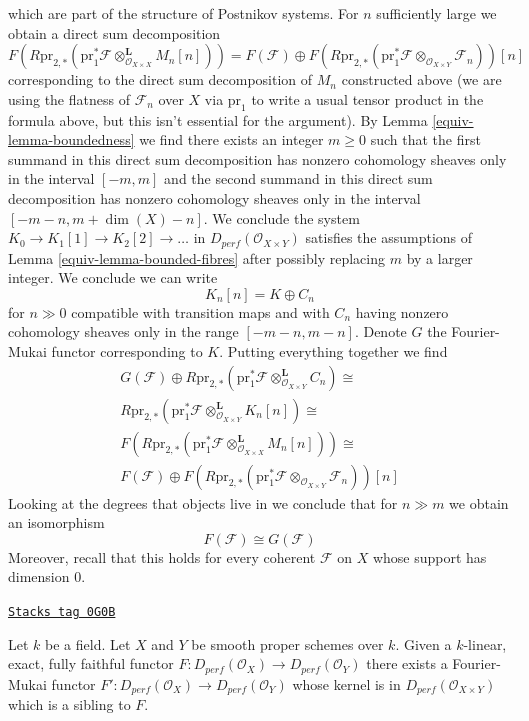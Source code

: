 which are part of the structure of Postnikov systems.
For $n$ sufficiently large we obtain a direct sum decomposition
$$
F(R\text{pr}_{2, *}(\text{pr}_1^*\mathcal{F}
\otimes^\mathbf{L}_{\mathcal{O}_{X \times X}} M_n[n]))
=
F(\mathcal{F}) \oplus
F(R\text{pr}_{2, *}(
\text{pr}_1^*\mathcal{F} \otimes_{\mathcal{O}_{X \times Y}} \mathcal{F}_n
))[n]
$$
corresponding to the direct sum decomposition of $M_n$ constructed above
(we are using the flatness of $\mathcal{F}_n$ over $X$ via $\text{pr}_1$
to write a usual tensor product in the formula above, but this isn't
essential for the argument).
By Lemma \ref{equiv-lemma-boundedness} we find there exists an integer $m \geq 0$
such that the first summand in this direct sum decomposition has nonzero
cohomology sheaves only in the interval $[-m, m]$ and the
second summand in this direct sum decomposition has nonzero cohomology
sheaves only in the interval $[-m - n, m + \dim(X) - n]$.
We conclude the system $K_0 \to K_1[1] \to K_2[2] \to \ldots$
in $D_{perf}(\mathcal{O}_{X \times Y})$ satisfies the assumptions of
Lemma \ref{equiv-lemma-bounded-fibres} after possibly replacing $m$ by
a larger integer. We conclude we can write
$$
K_n[n] = K \oplus C_n
$$
for $n \gg 0$ compatible with transition maps and with $C_n$
having nonzero cohomology sheaves only in the range $[-m - n, m - n]$.
Denote $G$ the Fourier-Mukai functor corresponding to $K$.
Putting everything together we find
$$
\begin{matrix}
G(\mathcal{F}) \oplus
R\text{pr}_{2, *}(
\text{pr}_1^*\mathcal{F} \otimes_{\mathcal{O}_{X \times Y}}^\mathbf{L} C_n)
\cong \\
R\text{pr}_{2, *}(\text{pr}_1^*\mathcal{F}
\otimes^\mathbf{L}_{\mathcal{O}_{X \times Y}} K_n[n]) \cong \\
F(R\text{pr}_{2, *}(\text{pr}_1^*\mathcal{F}
\otimes^\mathbf{L}_{\mathcal{O}_{X \times X}} M_n[n]))
\cong \\
F(\mathcal{F}) \oplus
F(R\text{pr}_{2, *}(
\text{pr}_1^*\mathcal{F} \otimes_{\mathcal{O}_{X \times Y}} \mathcal{F}_n
))[n]
\end{matrix}
$$
Looking at the degrees that objects live in we conclude that for $n \gg m$
we obtain an isomorphism
$$
F(\mathcal{F}) \cong G(\mathcal{F})
$$
Moreover, recall that this holds for every coherent $\mathcal{F}$ on $X$
whose support has dimension $0$.

\begin{lemma}
\label{equiv-lemma-fully-faithful}
\href{https://stacks.math.columbia.edu/tag/0G0B}{\texttt{Stacks tag 0G0B}}

Let $k$ be a field. Let $X$ and $Y$ be smooth proper schemes over $k$.
Given a $k$-linear, exact, fully faithful functor
$F : D_{perf}(\mathcal{O}_X) \to D_{perf}(\mathcal{O}_Y)$
there exists a Fourier-Mukai functor
$F' : D_{perf}(\mathcal{O}_X) \to D_{perf}(\mathcal{O}_Y)$ whose kernel
is in $D_{perf}(\mathcal{O}_{X \times Y})$ which is a sibling to $F$.
\end{lemma}

